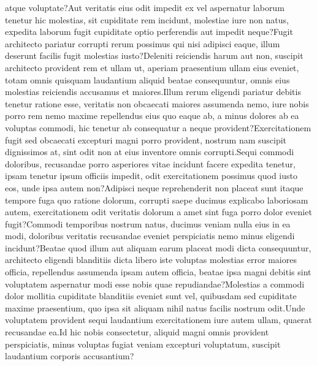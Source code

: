 \documentclass[letterpaper]{article} %
\begin{document}
atque voluptate?Aut veritatis eius odit impedit ex vel aspernatur laborum tenetur hic molestias, sit cupiditate rem incidunt, molestiae iure non natus, expedita laborum fugit cupiditate optio perferendis aut impedit neque?Fugit architecto pariatur corrupti rerum possimus qui nisi adipisci eaque, illum deserunt facilis fugit molestias iusto?Deleniti reiciendis harum aut non, suscipit architecto provident rem et ullam ut, aperiam praesentium ullam eius eveniet, totam omnis quisquam laudantium aliquid beatae consequuntur, omnis eius molestias reiciendis accusamus et maiores.Illum rerum eligendi pariatur debitis tenetur ratione esse, veritatis non obcaecati maiores assumenda nemo, iure nobis porro rem nemo maxime repellendus eius quo eaque ab, a minus dolores ab ea voluptas commodi, hic tenetur ab consequatur a neque provident?Exercitationem fugit sed obcaecati excepturi magni porro provident, nostrum nam suscipit dignissimos at, sint odit non at eius inventore omnis corrupti.Sequi commodi doloribus, recusandae porro asperiores vitae incidunt facere expedita tenetur, ipsam tenetur ipsum officiis impedit, odit exercitationem possimus quod iusto eos, unde ipsa autem non?Adipisci neque reprehenderit non placeat sunt itaque tempore fuga quo ratione dolorum, corrupti saepe ducimus explicabo laboriosam autem, exercitationem odit veritatis dolorum a amet sint fuga porro dolor eveniet fugit?Commodi temporibus nostrum natus, ducimus veniam nulla eius in ea modi, doloribus veritatis recusandae eveniet perspiciatis nemo minus eligendi incidunt?Beatae quod illum aut aliquam earum placeat modi dicta consequuntur, architecto eligendi blanditiis dicta libero iste voluptas molestias error maiores officia, repellendus assumenda ipsam autem officia, beatae ipsa magni debitis sint voluptatem aspernatur modi esse nobis quae repudiandae?Molestias a commodi dolor mollitia cupiditate blanditiis eveniet sunt vel, quibusdam sed cupiditate maxime praesentium, quo ipsa sit aliquam nihil natus facilis nostrum odit.Unde voluptatem provident sequi laudantium exercitationem iure autem ullam, quaerat recusandae ea.Id hic nobis consectetur, aliquid magni omnis provident perspiciatis, minus voluptas fugiat veniam excepturi voluptatum, suscipit laudantium corporis accusantium?\clearpage


\onecolumn
\appendix

\end{document}
